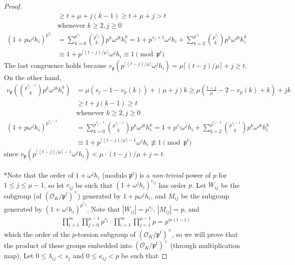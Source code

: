 \documentclass{treatise}
\begin{document}
\begin{shaded}
\begin{proof}
\begin{align*}
& \geq t + \mu + j (k - 1) \geq t + \mu + j > t \\
& \mbox{whenever } k \geq 2, j \geq 0 \\
(1 + p \omega^j h_i)^{p^{s_j}} & = \sum_{k = 0}^{p^{s_j}} {p^{s_j} \choose k} p^k \omega^{jk} h_i^k = 1 + p^{s_j + 1} \omega^j h_i + \sum_{k = 2}^{p^{s_j}} {p^{s_j} \choose k} p^k \omega^{jk} h_i^k \\
& \equiv 1 + p^{\lceil (t - j)/\mu \rceil} \omega^j h_i \equiv 1 \pmod{\mathfrak{p}^t}
\end{align*}
The last congruence holds because $v_\mathfrak{p} \left( p^{\lceil (t - j)/\mu \rceil} \omega^j h_i \right) = \mu \lceil (t - j)/\mu \rceil + j \geq t$. On the other hand,
\begin{align*}
v_\mathfrak{p} \left( {p^{s_j - 1} \choose k} p^k \omega^{jk} h_i^k \right) & = \mu (s_j - 1 - v_p(k)) + (\mu + j)k \geq \mu \left( \frac{t - j}{\mu} - 2 - v_p(k) + k \right) + jk \\
& \geq t + j (k - 1) \geq t \\
& \mbox{whenever } k \geq 2, j \geq 0 \\
(1 + p \omega^j h_i)^{p^{s_j - 1}} & = \sum_{k = 0}^{p^{s_j - 1}} {p^{s_j - 1} \choose k} p^k \omega^{jk} h_i^k = 1 + p^{s_j} \omega^j h_i + \sum_{k = 2}^{p^{s_j - 1}} {p^{s_j - 1} \choose k} p^k \omega^{jk} h_i^k \\
& \equiv 1 + p^{\lceil (t - j)/\mu \rceil - 1} \omega^j h_i \not\equiv 1 \pmod{\mathfrak{p}^t}
\end{align*}
since $v_\mathfrak{p} \left( p^{\lceil (t - j)/\mu \rceil - 1} \omega^j h_i \right) < \mu \cdot (t - j)/\mu + j = t$.
\\
\\
*Note that the order of $1+\omega^j h_i$ (modulo $\mathfrak{p}^t$) is a \textit{non-trivial} power of $p$ for $1 \leq j \leq \mu - 1$, so let $r_{ij}$ be such that $(1 + \omega^j h_i)^{r_{ij}}$ has order $p$. Let $W_{ij}$ be the subgroup (of $\left( \mathcal{O}_K/\mathfrak{p}^t \right)^\times$) generated by $1 + p \omega^j h_i$, and $M_{ij}$ be the subgroup generated by $(1 + \omega^j h_i)^{p^{r_{ij}}}$. Note that $|W_{ij}| = p^{s_j}$, $|M_{ij}| = p$, and
\begin{align*}
\prod_{i = 1}^m \prod_{j = 0}^{\mu - 1} p^{s_j} \cdot \prod_{i = 1}^m \prod_{j = 1}^{\mu - 1} p = p^{m(t - 1)}
\end{align*}
which the order of the $p$-torsion subgroup of $\left( \mathcal{O}_K/\mathfrak{p}^t \right)^\times$, so we will prove that the product of these groups embedded into $\left( \mathcal{O}_K/\mathfrak{p}^t \right)^\times$ (through multiplication map). Let $0 \leq \lambda_{ij} < s_j$ and $0 \leq \kappa_{ij} < p$ be such that

\end{proof}
\end{shaded}
\end{document}
